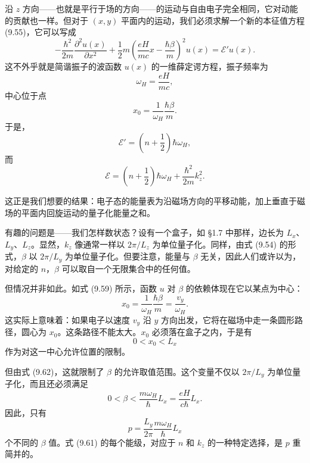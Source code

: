 沿 $z$ 方向——也就是平行于场的方向——的运动与自由电子完全相同，它对动能的贡献也一样。但对于 $(x,y)$ 平面内的运动，我们必须求解一个新的本征值方程 (9.55)，它可以写成
\begin{equation*}
-\frac{\hbar^{2}}{2m}\frac{\partial^{2}u(x)}{\partial x^{2}}+\frac{1}{2}m\left(\frac{eH}{mc}x-\frac{\hbar\beta}{m}\right)^{2}u(x)=\mathcal{E}'u(x).
\tag{9.57}
\end{equation*}
这不外乎就是简谐振子的波函数 $u(x)$ 的一维薛定谔方程，振子频率为
\begin{equation*}
\omega_{H}=\frac{eH}{mc},
\tag{9.58}
\end{equation*}
中心位于点
\begin{equation*}
x_{0}=\frac{1}{\omega_{H}}\frac{\hbar\beta}{m}.
\tag{9.59}
\end{equation*}
于是，
\begin{equation*}
\mathcal{E}'=\left(n+\frac{1}{2}\right)\hbar\omega_{H},
\tag{9.60}
\end{equation*}
而
\begin{equation*}
\mathcal{E}=\left(n+\frac{1}{2}\right)\hbar\omega_{H}+\frac{\hbar^{2}}{2m}k_{z}^{2}.
\tag{9.61}
\end{equation*}

这正是我们想要的结果：电子态的能量表为沿磁场方向的平移动能，加上垂直于磁场的平面内回旋运动的量子化能量之和。

有趣的问题是——我们怎样数状态？设有一个盒子，如 §1.7 中那样，边长为 $L_{x}$、$L_{y}$、$L_{z}$。显然，$k_{z}$ 像通常一样以 $2\pi/L_{z}$ 为单位量子化。同样，由式 (9.54) 的形式，$\beta$ 以 $2\pi/L_{y}$ 为单位量子化。但要注意，能量与 $\beta$ 无关，因此人们或许以为，对给定的 $n$，$\beta$ 可以取自一个无限集合中的任何值。

但情况并非如此。如式 (9.59) 所示，函数 $u$ 对 $\beta$ 的依赖体现在它以某点为中心：
\begin{equation*}
x_{0}=\frac{1}{\omega_{H}}\frac{\hbar\beta}{m}=\frac{v_{y}}{\omega_{H}}.
\tag{9.62}
\end{equation*}
这实际上意味着：如果电子以速度 $v_{y}$ 沿 $y$ 方向出发，它将在磁场中走一条圆形路径，圆心为 $x_{0}$。这条路径不能太大。$x_{0}$ 必须落在盒子之内，于是有
\begin{equation*}
0<x_{0}<L_{x}
\tag{9.63}
\end{equation*}
作为对这一中心允许位置的限制。


但由式 (9.62)，这就限制了 $\beta$ 的允许取值范围。这个变量不仅以 $2\pi/L_{y}$ 为单位量子化，而且还必须满足
\begin{equation*}
0<\beta<\frac{m\omega_{H}}{\hbar}L_{x}=\frac{eH}{c\hbar}L_{x}.
\tag{9.64}
\end{equation*}
因此，只有
\begin{equation*}
p=\frac{L_{y}}{2\pi}\frac{m\omega_{H}}{\hbar}L_{x}
\tag{9.65}
\end{equation*}
个不同的 $\beta$ 值。式 (9.61) 的每个能级，对应于 $n$ 和 $k_{z}$ 的一种特定选择，是 $p$ 重简并的。

